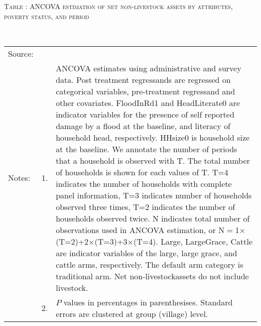 \hspace{-1cm}\begin{minipage}[t]{14cm}
\hfil\textsc{\normalsize Table \thetable: ANCOVA estimation of net non-livestock assets by attributes, poverty status, and period\label{tab ANCOVA NetNLAssets timevarying poverty status attributes}}\\
\setlength{\tabcolsep}{1pt}
\setlength{\baselineskip}{8pt}
\renewcommand{\arraystretch}{.55}
\hfil{}\\
\renewcommand{\arraystretch}{.8}
\setlength{\tabcolsep}{1pt}
\begin{tabular}{>{\hfill\scriptsize}p{1cm}<{}>{\hfill\scriptsize}p{.25cm}<{}>{\scriptsize}p{12cm}<{\hfill}}
Source:& \multicolumn{2}{l}{\scriptsize Estimated with GUK administrative and survey data.}\\
Notes: & 1. & ANCOVA estimates using administrative and survey data. Post treatment regressands are regressed on categorical variables, pre-treatment regressand and other covariates. \textsf{FloodInRd1} and \textsf{HeadLiterate0} are indicator variables for the presence of self reported damage by a flood at the baseline, and literacy of household head, respectively. \textsf{HHsize0} is household size at the baseline. We annotate the number of periods that a household is observed with \textsf{T}. The total number of households is shown for each values of \textsf{T}. \textsf{T=4} indicates the number of households with complete panel information, \textsf{T=3} indicates number of households observed three times, \textsf{T=2} indicates the number of households observed twice. \textsf{N} indicates total number of observations used in ANCOVA estimation, or \textsf{N$=$1$\times$(T=2)+2$\times$(T=3)+3$\times$(T=4)}.  \textsf{Large}, \textsf{LargeGrace}, \textsf{Cattle} are indicator variables of the \textsf{large}, \textsf{large grace}, and \textsf{cattle} arms, respectively. The default arm category is \textsf{traditional} arm. Net non-livestockassets do not include livestock. \\
& 2. & $P$ values in percentages in parenthesises. Standard errors are clustered at group (village) level.
\end{tabular}
\end{minipage}

